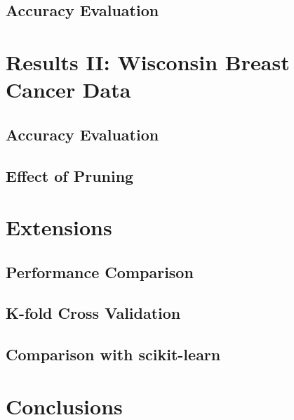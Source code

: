 \documentclass[12pt, conference, compsocconf]{IEEEtran}
\begin{document}
\subsection{Accuracy Evaluation}

\section{Results II: Wisconsin Breast Cancer Data}

\subsection{Accuracy Evaluation}

\subsection{Effect of Pruning}

\section{Extensions}

\subsection{Performance Comparison}

\subsection{K-fold Cross Validation}

\subsection{Comparison with scikit-learn}

\section{Conclusions}

%
%
\end{document}
